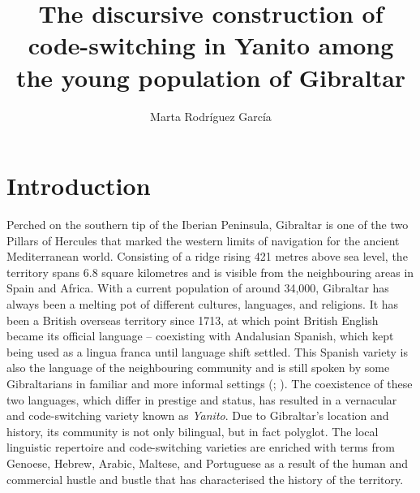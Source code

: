 \documentclass[output=paper]{langscibook}
\author{Marta Rodríguez García \orcid{0000-0003-4104-0589} \affiliation{University of Basel}}
\title[The discursive construction of code-switching in Yanito]{The discursive construction of code-switching in Yanito among the young population of Gibraltar}
\begin{document}
\maketitle

\section{Introduction}\label{RG:sec:01}

Perched on the southern tip of the Iberian Peninsula, Gibraltar is one of the two Pillars of Hercules that marked the western limits of navigation for the ancient Mediterranean world. Consisting of a ridge rising 421 metres above sea level, the territory spans 6.8 square kilometres and is visible from the neighbouring areas in Spain and Africa. With a current population of around 34,000, Gibraltar has always been a melting pot of different cultures, languages, and religions. It has been a British overseas territory since 1713, at which point British English became its official language – coexisting with Andalusian Spanish, which kept being used as a lingua franca until language shift settled. This Spanish variety is also the language of the neighbouring community and is still spoken by some Gibraltarians in familiar and more informal settings (\citealt{moyer_analysis_1993}; \citealt{kellermann_new_2001}). 
The coexistence of these two languages, which differ in prestige and status, has resulted in a vernacular and code-switching variety known as \textit{Yanito}. Due to Gibraltar’s location and history, its community is not only bilingual, but in fact polyglot. The local linguistic repertoire and code-switching varieties are enriched with terms from Genoese, Hebrew, Arabic, Maltese, and Portuguese as a result of the human and commercial hustle and bustle that has characterised the history of the territory.
\end{document}
